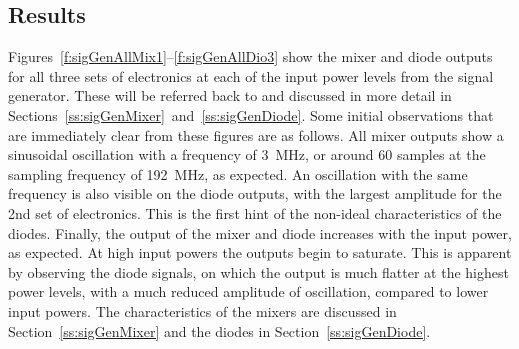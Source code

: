 \subsection{Results}
\label{ss:sigGenResults}

Figures~\ref{f:sigGenAllMix1}--\ref{f:sigGenAllDio3} show the mixer and diode outputs for all three sets of electronics at each of the input power levels from the signal generator. These will be referred back to and discussed in more detail in Sections~\ref{ss:sigGenMixer}~and~\ref{ss:sigGenDiode}. Some initial observations that are immediately clear from these figures are as follows. All mixer outputs show a sinusoidal oscillation with a frequency of 3~MHz, or around 60 samples at the sampling frequency of 192~MHz, as expected. An oscillation with the same frequency is also visible on the diode outputs, with the largest amplitude for the 2nd set of electronics. This is the first hint of the non-ideal characteristics of the diodes. Finally, the output of the mixer and diode increases with the input power, as expected. At high input powers the outputs begin to saturate. This is apparent by observing the diode signals, on which the output is much flatter at the highest power levels, with a much reduced amplitude of oscillation, compared to lower input powers. The characteristics of the mixers are discussed in Section~\ref{ss:sigGenMixer} and the diodes in Section~\ref{ss:sigGenDiode}.

